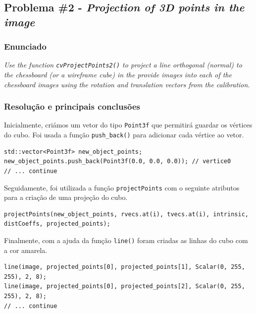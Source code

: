 \documentclass[portuguese, times, mirror]{revdetua}
\begin{document}
\subsection{Problema \#2 - \textit{Projection of 3D points in the image}}

\subsubsection{Enunciado}
\textit{Use the function \texttt{cvProjectPoints2()} to project a line orthogonal (normal) to the chessboard (or a wireframe cube) in the provide images into each of the chessboard images using the rotation and translation vectors from the calibration.}

\subsubsection{Resolução e principais conclusões}


Inicialmente, criámos um vetor do tipo \texttt{Point3f} que permitirá guardar os vértices do cubo. Foi usada a função \texttt{push\_back()} para adicionar cada vértice ao vetor.  


\begin{lstlisting}[caption=Criação do vetor para Proposta de resolução do exercício 5,label=code:C]
std::vector<Point3f> new_object_points;
new_object_points.push_back(Point3f(0.0, 0.0, 0.0)); // vertice0
// ... continue
\end{lstlisting}

Seguidamente, foi utilizada a função \texttt{projectPoints} com o seguinte atributos para a criação de uma projeção do cubo.

\begin{lstlisting}[caption=Criação do vetor para Proposta de resolução do exercício 5,label=code:C]
projectPoints(new_object_points, rvecs.at(i), tvecs.at(i), intrinsic, distCoeffs, projected_points);
\end{lstlisting}
  
Finalmente, com a ajuda da função \texttt{line()} foram criadas as linhas do cubo com a cor amarela.

\begin{lstlisting}[caption=Desenhar linhas do cubo,label=code:C]
line(image, projected_points[0], projected_points[1], Scalar(0, 255, 255), 2, 8);
line(image, projected_points[0], projected_points[2], Scalar(0, 255, 255), 2, 8);
// ... continue
\end{lstlisting}
\end{document}
